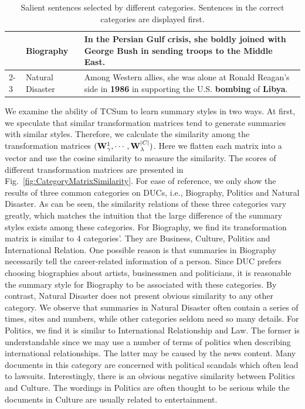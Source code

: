 \documentclass[letterpaper]{article}
\begin{document}
\begin{table}[t]
\begin{tabular}{l|l|p{11cm}}
		& Biography        & In the Persian Gulf crisis, she \textbf{boldly} joined with George Bush in sending troops to the Middle East.                                                                       \\ \cline{2-3}
		& Natural Disaster & Among Western allies, she was alone at Ronald Reagan's side in \textbf{1986} in supporting the U.S. \textbf{bombing} of \textbf{Libya}.                                                               \\ \hline
	\end{tabular}
	\caption{Salient sentences selected by different categories. Sentences in the correct categories are displayed first.}
	\label{tb:summaryWithCategory}
\end{table}

We examine the ability of TCSum to learn summary styles in two ways.
At first, we speculate that similar transformation matrices tend to generate summaries with similar styles.
Therefore, we calculate the similarity among the transformation matrices $({\bf{W}}_\gamma ^1, \cdots ,{\bf{W}}_\lambda ^{|C|})$.
Here we flatten each matrix into a vector and use the cosine similarity to measure the similarity.
The scores of different transformation matrices are presented in Fig.~\ref{fig:CategoryMatrixSimilarity}.
For ease of reference, we only show the results of three common categories on DUCs, i.e., Biography, Politics and Natural Disaster.
As can be seen, the similarity relations of these three categories vary greatly, which matches the intuition that the large difference of the summary styles exists among these categories.
For Biography, we find its transformation matrix is similar to 4 categories'. They are Business, Culture, Politics and International Relation.
One possible reason is that summaries in Biography necessarily tell the career-related information of a person.
Since DUC prefers choosing biographies about artists, businessmen and politicians, it is reasonable the summary style for Biography to be associated with these categories.
By contrast, Natural Disaster does not present obvious similarity to any other category.
We observe that summaries in Natural Disaster often contain a series of times, sites and numbers, while other categories seldom need so many details.
For Politics, we find it is similar to International Relationship and Law.
The former is understandable since we may use a number of terms of politics when describing international relationships.
The latter may be caused by the news content.
Many documents in this category are concerned with political scandals which often lead to lawsuits.
Interestingly, there is an obvious negative similarity between Politics and Culture.
The wordings in Politics are often thought to be serious while the documents in Culture are usually related to entertainment.
\end{document}
